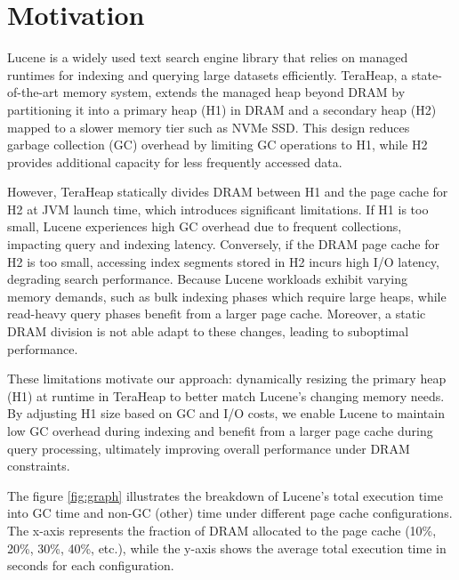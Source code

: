 \section{Motivation}
Lucene is a widely used text search engine library that relies on managed
runtimes for indexing and querying large datasets efficiently. TeraHeap, a
state-of-the-art memory system, extends the managed heap beyond DRAM by
partitioning it into a primary heap (H1) in DRAM and a secondary heap (H2)
mapped to a slower memory tier such as NVMe SSD. This design reduces garbage
collection (GC) overhead by limiting GC operations to H1, while H2 provides
additional capacity for less frequently accessed data.

However, TeraHeap statically divides DRAM between H1 and the page cache for H2
at JVM launch time, which introduces significant limitations. If H1 is too
small, Lucene experiences high GC overhead due to frequent collections,
impacting query and indexing latency. Conversely, if the DRAM page cache for H2
is too small, accessing index segments stored in H2 incurs high I/O latency,
degrading search performance. Because Lucene workloads exhibit varying memory
demands, such as bulk indexing phases which require large heaps, while
read-heavy query phases benefit from a larger page cache. Moreover, a static
DRAM division is not able adapt to these changes, leading to suboptimal
performance.

These limitations motivate our approach: dynamically resizing the primary heap
(H1) at runtime in TeraHeap to better match Lucene’s changing memory needs. By
adjusting H1 size based on GC and I/O costs, we enable Lucene to maintain low GC
overhead during indexing and benefit from a larger page cache during query
processing, ultimately improving overall performance under DRAM constraints.

The figure \ref{fig:graph} illustrates the breakdown of Lucene’s total execution
time into GC time and non-GC (other) time under different page cache
configurations. The x-axis represents the fraction of DRAM allocated to the page
cache (10\%, 20\%, 30\%, 40\%, etc.), while the y-axis shows the average total
execution time in seconds for each configuration.

